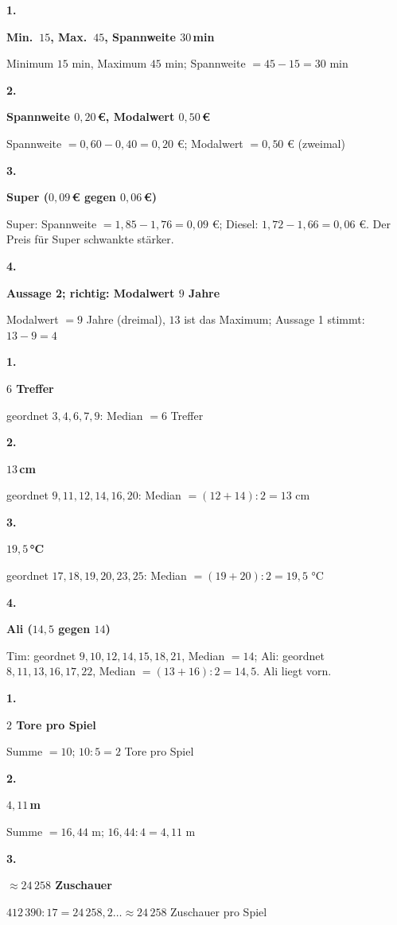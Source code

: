 \documentclass[11pt]{article}
\newcommand{\lsg}[3]{\par\noindent\begin{minipage}[t]{9mm}\textbf{#1}\end{minipage}%
  \begin{minipage}[t]{52mm}\raggedright\bfseries\boldmath #2\end{minipage}\hspace{3mm}%
  \begin{minipage}[t]{\dimexpr\linewidth-64mm\relax}\raggedright\small #3\end{minipage}\par\vspace{4pt}}
\begin{document}
\par\smallskip
{}\par
\par\Needspace{25mm}\vspace{6pt}\noindent\colorbox{black!12}{}\hspace{2mm}{\bfseries Spannweite und Modalwert}\par\vspace{4pt}
\lsg{1.}{Min.\ $15$, Max.\ $45$, Spannweite $30$\,min}{Minimum $15$ min, Maximum $45$ min; Spannweite $= 45 - 15 = 30$ min}
\lsg{2.}{Spannweite $0{,}20$\,€, Modalwert $0{,}50$\,€}{Spannweite $= 0{,}60 - 0{,}40 = 0{,}20$ €; Modalwert $= 0{,}50$ € (zweimal)}
\lsg{3.}{Super ($0{,}09$\,€ gegen $0{,}06$\,€)}{Super: Spannweite $= 1{,}85 - 1{,}76 = 0{,}09$ €; Diesel: $1{,}72 - 1{,}66 = 0{,}06$ €. Der Preis für Super schwankte stärker.}
\lsg{4.}{Aussage 2; richtig: Modalwert $9$ Jahre}{Modalwert $= 9$ Jahre (dreimal), $13$ ist das Maximum; Aussage 1 stimmt: $13 - 9 = 4$}
\par\Needspace{25mm}\vspace{6pt}\noindent\colorbox{black!12}{}\hspace{2mm}{\bfseries Median}\par\vspace{4pt}
\lsg{1.}{$6$ Treffer}{geordnet $3, 4, 6, 7, 9$: Median $= 6$ Treffer}
\lsg{2.}{$13$\,cm}{geordnet $9, 11, 12, 14, 16, 20$: Median $= (12 + 14) : 2 = 13$ cm}
\lsg{3.}{$19{,}5$\,°C}{geordnet $17, 18, 19, 20, 23, 25$: Median $= (19 + 20) : 2 = 19{,}5$ °C}
\lsg{4.}{Ali ($14{,}5$ gegen $14$)}{Tim: geordnet $9, 10, 12, 14, 15, 18, 21$, Median $= 14$; Ali: geordnet $8, 11, 13, 16, 17, 22$, Median $= (13 + 16) : 2 = 14{,}5$. Ali liegt vorn.}
\par\Needspace{25mm}\vspace{6pt}\noindent\colorbox{black!12}{}\hspace{2mm}{\bfseries Arithmetisches Mittel}\par\vspace{4pt}
\lsg{1.}{$2$ Tore pro Spiel}{Summe $= 10$; $10 : 5 = 2$ Tore pro Spiel}
\lsg{2.}{$4{,}11$\,m}{Summe $= 16{,}44$ m; $16{,}44 : 4 = 4{,}11$ m}
\lsg{3.}{$\approx 24\,258$ Zuschauer}{$412\,390 : 17 = 24\,258{,}2\ldots \approx 24\,258$ Zuschauer pro Spiel}
\end{document}
